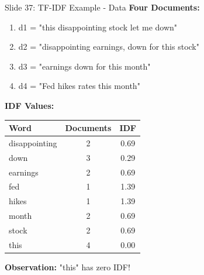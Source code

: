 \documentclass[8pt]{beamer}
\begin{document}
	\begin{frame}{Slide 37: TF-IDF Example - Data}
		\fontsize{6.5}{7.5}\selectfont
		\textbf{Four Documents:}
		\begin{enumerate}
			\item d1 = "this disappointing stock let me down"
			\item d2 = "disappointing earnings, down for this stock"
			\item d3 = "earnings down for this month"
			\item d4 = "Fed hikes rates this month"
		\end{enumerate}
		
		\vspace{0.1cm}
		\textbf{IDF Values:}
		\begin{tabular}{|l|c|c|}
			\hline
			Word & Documents & IDF \\
			\hline
			disappointing & 2 & 0.69 \\
			down & 3 & 0.29 \\
			earnings & 2 & 0.69 \\
			fed & 1 & 1.39 \\
			hikes & 1 & 1.39 \\
			month & 2 & 0.69 \\
			stock & 2 & 0.69 \\
			this & 4 & 0.00 \\
			\hline
		\end{tabular}
		
		\textcolor{myblue}{\textbf{Observation:}} "this" has zero IDF!
	\end{frame}
	
\end{document}
